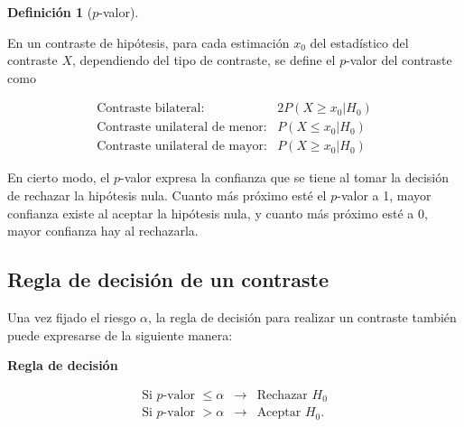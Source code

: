 \documentclass[
  a4paper,
]{scrreport}
\theoremstyle{definition}
\newtheorem{definition}{Definición}[chapter]
\theoremstyle{definition}
\theoremstyle{plain}
\theoremstyle{remark}
\begin{document}
\begin{definition}[\(p\)-valor]\protect\hypertarget{def-p-valor}{}\label{def-p-valor}

En un contraste de hipótesis, para cada estimación \(x_0\) del
estadístico del contraste \(X\), dependiendo del tipo de contraste, se
define el \(p\)-valor del contraste como

\[
\begin{array}{lc}
\mbox{Contraste bilateral}: & 2P(X\geq x_0|H_0) \\
\mbox{Contraste unilateral de menor}: & P(X\leq x_0|H_0) \\
\mbox{Contraste unilateral de mayor}: & P(X\geq x_0|H_0)
\end{array}
\]

\end{definition}

En cierto modo, el \(p\)-valor expresa la confianza que se tiene al
tomar la decisión de rechazar la hipótesis nula. Cuanto más próximo esté
el \(p\)-valor a 1, mayor confianza existe al aceptar la hipótesis nula,
y cuanto más próximo esté a 0, mayor confianza hay al rechazarla.

\hypertarget{regla-de-decisiuxf3n-de-un-contraste}{%
\subsection{Regla de decisión de un
contraste}\label{regla-de-decisiuxf3n-de-un-contraste}}

Una vez fijado el riesgo \(\alpha\), la regla de decisión para realizar
un contraste también puede expresarse de la siguiente manera:

\begin{tcolorbox}[enhanced jigsaw, colbacktitle=quarto-callout-important-color!10!white, toptitle=1mm, colback=white, toprule=.15mm, bottomrule=.15mm, rightrule=.15mm, left=2mm, colframe=quarto-callout-important-color-frame, coltitle=black, bottomtitle=1mm, arc=.35mm, titlerule=0mm, title=\textcolor{quarto-callout-important-color}{\faExclamation}\hspace{0.5em}{Importante}, breakable, opacitybacktitle=0.6, leftrule=.75mm, opacityback=0]

\textbf{Regla de decisión}

\[
\begin{array}{ccc}
\mbox{Si $p$-valor $\leq \alpha$} & \rightarrow & \mbox{Rechazar $H_0$} \\
\mbox{Si $p$-valor $> \alpha$} & \rightarrow & \mbox{Aceptar $H_0$}.
\end{array}
\]

\end{tcolorbox}
\end{document}

